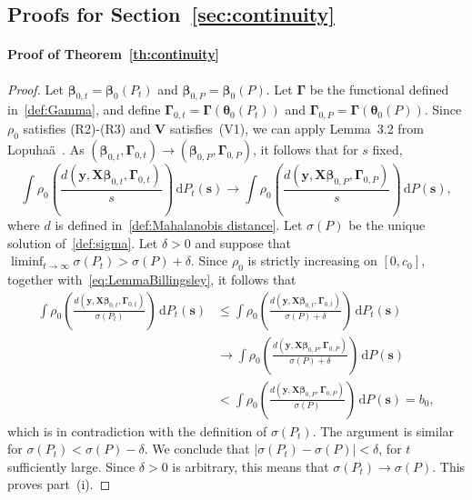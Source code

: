 \documentclass{article}
\numberwithin{equation}{section}
\theoremstyle{plain}
\newcommand{\bbeta}{\bm\beta}
\newcommand{\btheta}{\bm\theta}
\newcommand{\bGamma}{\bm\Gamma}
\newcommand{\by}{\mathbf{y}}
\newcommand{\bs}{\mathbf{s}}
\newcommand{\bX}{\mathbf{X}}
\newcommand{\bV}{\mathbf{V}}
\begin{document}
\subsection{Proofs for Section~\ref{sec:continuity}}

\paragraph*{Proof of Theorem~\ref{th:continuity}}
\begin{proof}
Let $\bbeta_{0,t}=\bbeta_0(P_t)$ and $\bbeta_{0,P}=\bbeta_0(P)$.
Let $\bGamma$ be the functional defined in~\eqref{def:Gamma},
and define $\bGamma_{0,t}=\bGamma(\btheta_0(P_t))$ and $\bGamma_{0,P}=\bGamma(\btheta_0(P))$.
Since $\rho_0$ satisfies (R2)-(R3) and $\bV$ satisfies~(V1),
we can apply Lemma~3.2 from Lopuha\"a~\cite{lopuhaa1989}.
As $(\bbeta_{0,t},\bGamma_{0,t})\to(\bbeta_{0,P},\bGamma_{0,P})$, 
it follows that for $s$ fixed,
\begin{equation}
\label{eq:LemmaBillingsley}
\int
\rho_0
\left(
\frac{d(\by,\bX\bbeta_{0,t},\bGamma_{0,t})}{s}
\right)
\,
\text{d}P_t(\bs)
\to
\int
\rho_0
\left(
\frac{d(\by,\bX\bbeta_{0,P},\bGamma_{0,P})}{s}
\right)
\,
\text{d}P(\bs),
\end{equation}
where $d$ is defined in~\eqref{def:Mahalanobis distance}.
Let $\sigma(P)$ be the unique solution of~\eqref{def:sigma}.
Let $\delta>0$ and suppose that $\liminf_{t\to\infty} \sigma(P_t)>\sigma(P)+\delta$.
Since $\rho_0$ is strictly increasing on $[0,c_0]$,
together with~\eqref{eq:LemmaBillingsley}, 
it follows that
\[
\begin{split}
\int
\rho_0
\left(
\frac{d(\by,\bX\bbeta_{0,t},\bGamma_{0,t})}{\sigma(P_t)}
\right)
\,
\text{d}P_t(\bs)
&\leq
\int
\rho_0
\left(
\frac{d(\by,\bX\bbeta_{0,t},\bGamma_{0,t})}{\sigma(P)+\delta}
\right)
\,
\text{d}P_t(\bs)\\
&\to
\int
\rho_0
\left(
\frac{d(\by,\bX\bbeta_{0,P},\bGamma_{0,P})}{\sigma(P)+\delta}
\right)
\,
\text{d}P(\bs)\\
&<
\int
\rho_0
\left(
\frac{d(\by,\bX\bbeta_{0,P},\bGamma_{0,P})}{\sigma(P)}
\right)
\,
\text{d}P(\bs)
=
b_0,
\end{split}
\]
which is in contradiction with the definition of $\sigma(P_t)$.
The argument is similar for $\sigma(P_t)<\sigma(P)-\delta$.
We conclude that $|\sigma(P_t)-\sigma(P)|<\delta$, for $t$ sufficiently large.
Since $\delta>0$ is arbitrary, this means that $\sigma(P_t)\to\sigma(P)$.
This proves part~(i).


\end{proof}
\end{document}
